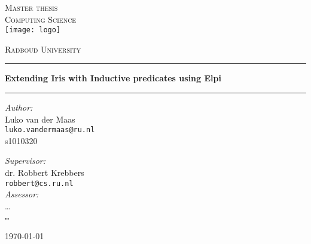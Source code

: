 \documentclass[11pt,a4paper]{report}
\begin{document}
\VerbatimFootnotes

\renewcommand{\sectionautorefname}{Section}
\renewcommand{\subsectionautorefname}{Section}
\renewcommand{\chapterautorefname}{Chapter}

\begin{titlepage}
    \begin{center}
        \textsc{\LARGE Master thesis\\Computing Science}\\[1.5cm]
        \texttt{[image: logo]}

        \vspace{0.4cm}
        \textsc{\Large Radboud University}\\[1cm]
        \hrule
        \vspace{0.4cm}
        \textbf{\huge Extending Iris with Inductive predicates using Elpi}\\[0.4cm]
        \hrule
        \vspace{2cm}
        \begin{minipage}[t]{0.45\textwidth}
            \begin{flushleft} \large
                \textit{Author:}\\
                Luko van der Maas\\
                \texttt{luko.vandermaas@ru.nl}\\
                s1010320
            \end{flushleft}
        \end{minipage}
        \begin{minipage}[t]{0.45\textwidth}
            \begin{flushright} \large
                \textit{Supervisor:}\\
                dr. Robbert Krebbers\\
                \texttt{robbert@cs.ru.nl}\\[1.3cm]
                \textit{Assessor:}\\
                \dots\\
                \texttt{\dots}
            \end{flushright}
        \end{minipage}
        \vfill
        {\large \today}
    \end{center}
\end{titlepage}



\tableofcontents




\end{document}
